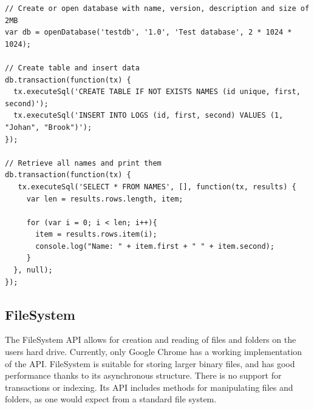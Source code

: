 \begin{Code}
\begin{lstlisting}[caption={Use of WebSQL}, label={lst:websql}]
// Create or open database with name, version, description and size of 2MB
var db = openDatabase('testdb', '1.0', 'Test database', 2 * 1024 * 1024);

// Create table and insert data
db.transaction(function(tx) {
  tx.executeSql('CREATE TABLE IF NOT EXISTS NAMES (id unique, first, second)');
  tx.executeSql('INSERT INTO LOGS (id, first, second) VALUES (1, "Johan", "Brook")');
});

// Retrieve all names and print them
db.transaction(function(tx) {
   tx.executeSql('SELECT * FROM NAMES', [], function(tx, results) {
     var len = results.rows.length, item;

     for (var i = 0; i < len; i++){
       item = results.rows.item(i);
       console.log("Name: " + item.first + " " + item.second);
     }
  }, null);
});
\end{lstlisting}
\end{Code}

\subsection{FileSystem}
\label{sec:filesystem}
The FileSystem API allows for creation and reading of files and folders on the users hard drive. Currently, only Google Chrome has a working implementation of the API. FileSystem is suitable for storing larger binary files, and has good performance thanks to its asynchronous structure. There is no support for transactions or indexing. Its API includes methods for manipulating files and folders, as one would expect from a standard file system.

